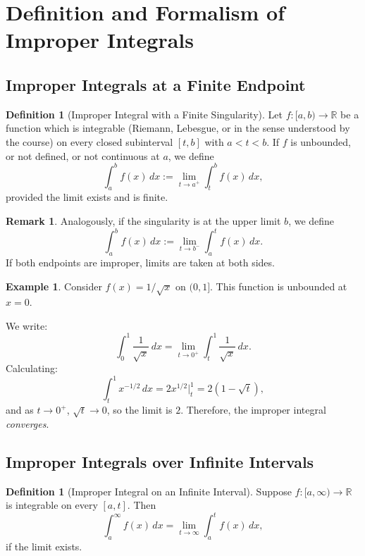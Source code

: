 \documentclass[12pt]{article}
\theoremstyle{definition}
\newtheorem{definition}[theorem]{Definition}
\newtheorem{example}[theorem]{Example}
\newtheorem{remark}[theorem]{Remark}
\begin{document}
\vspace{0.4cm}

\section{Definition and Formalism of Improper Integrals}

\subsection{Improper Integrals at a Finite Endpoint}

\begin{definition}[Improper Integral with a Finite Singularity]
Let $f : [a, b) \to \mathbb{R}$ be a function which is integrable (Riemann, Lebesgue, or in the sense understood by the course) on every closed subinterval $[t,b]$ with $a < t < b$. If $f$ is unbounded, or not defined, or not continuous at $a$, we define
\[
\int_{a}^{b} f(x) \, dx := \lim_{t \to a^+} \int_{t}^{b} f(x) \, dx,
\]
provided the limit exists and is finite.
\end{definition}

\begin{remark}
Analogously, if the singularity is at the upper limit $b$, we define
\[
\int_{a}^{b} f(x)\, dx := \lim_{t \to b^-} \int_{a}^{t} f(x) \, dx.
\]
If both endpoints are improper, limits are taken at both sides.
\end{remark}

\begin{example}
Consider $f(x) = 1/\sqrt{x}$ on $(0,1]$. This function is unbounded at $x = 0$.

We write:
\[
\int_{0}^{1} \frac{1}{\sqrt{x}} \, dx = \lim_{t \to 0^+} \int_{t}^{1} \frac{1}{\sqrt{x}} \, dx.
\]
Calculating:
\[
\int_{t}^{1} x^{-1/2} \, dx = 2x^{1/2} \Big|_t^1 = 2(1 - \sqrt{t}),
\]
and as $t\rightarrow 0^+$, $\sqrt{t} \to 0$, so the limit is $2$. Therefore, the improper integral \emph{converges}.
\end{example}

\subsection{Improper Integrals over Infinite Intervals} 

\begin{definition}[Improper Integral on an Infinite Interval]
 Suppose $f : [a, \infty) \to \mathbb{R}$ is integrable on every $[a, t]$. Then
\[
\int_a^{\infty} f(x)\, dx = \lim_{t\to\infty} \int_a^{t} f(x)\, dx,
\]
if the limit exists.
\end{definition}
\end{document}
